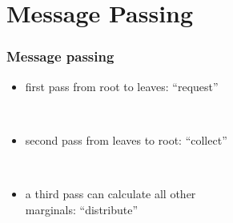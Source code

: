 \section{Message Passing}



\begin{frame} \frametitle{Message passing}
	\begin{minipage}[c]{12.1cm}
		\begin{minipage}[][1cm][c]{8cm}
			\begin{itemize}
				\item first pass from root to leaves: ``request''
			\end{itemize}
		\end{minipage}
		\hfill {} \\
		\begin{minipage}[c]{8cm}
			\begin{itemize}
				\item second pass from leaves to root: ``collect''
			\end{itemize}
		\end{minipage}
		\hfill {} \\
		\pause
		\begin{minipage}{8cm}
			\begin{itemize}
				\item a third pass can calculate all other \\
					marginals: ``distribute''
			\end{itemize}
		\end{minipage}
		\hfill {} \\
	\end{minipage}
\end{frame}


